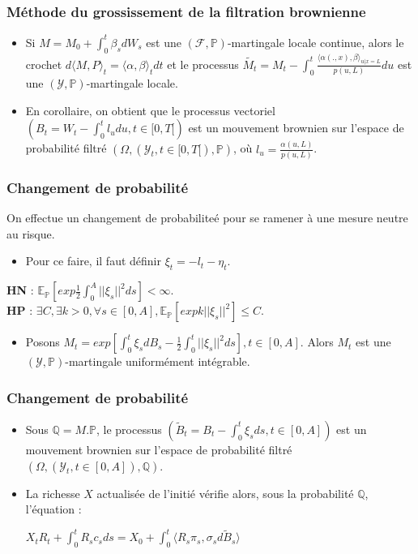 \documentclass[french]{beamer}
\begin{document}
\begin{frame}
\frametitle{Méthode du grossissement de la filtration brownienne}
\begin{itemize}
\item Si $M = M_0 + \int_{0}^{t} \beta_s dW_s$ est une $(\mathcal{F}, \mathbb{P})$-martingale locale continue, alors le crochet $d\langle M,P \rangle_t = \langle \alpha, \beta \rangle_tdt$ et le processus $\tilde{M_t} = M_t - \int_{0}^{t}\frac{\langle \alpha(.,x),\beta\rangle_{u|x=L}}{p(u,L)}du$ est une $(\mathcal{Y}, \mathbb{P})$-martingale locale.
\item En corollaire, on obtient que le processus vectoriel $(B_t = W_t - \int_{0}^{t} l_udu, t \in [0,T[)$ est un mouvement brownien sur l'espace de probabilité filtré $(\Omega, (\mathcal{Y}_t , t \in [0, T[), \mathbb{P})$, où $l_u = \frac{\alpha(u,L)}{p(u,L)}$. 
\end{itemize}
\end{frame}

\begin{frame}
\frametitle{Changement de probabilité}
On effectue un changement de probabiliteé pour se ramener à une mesure neutre au risque.
\begin{itemize}
\item Pour ce faire, il faut définir $\xi_t = - l_t - \eta_t $.\\
\end{itemize}
\textbf{HN} : $\mathbb{E}_\mathbb{P} [exp\frac{1}{2} \int_{0}^{A} ||\xi_s||^2 ds] < \infty$.\\
\textbf{HP} : $\exists C, \exists k >0, \forall s \in [0,A], \mathbb{E}_\mathbb{P}[exp k||\xi_s||^2] \leq C$.\\
\begin{itemize}
\item Posons $M_t = exp[\int_{0}^{t} \xi_s dB_s - \frac{1}{2} \int_{0}^{t} ||\xi_s||^2 ds], t \in [0,A]$. Alors $M_t$ est une $(\mathcal{Y}, \mathbb{P})$-martingale uniformément intégrable.
\end{itemize}
\end{frame}

\begin{frame}
\frametitle{Changement de probabilité}
\begin{itemize}
\item Sous $\mathbb{Q} = M. \mathbb{P}$, le processus $(\tilde{B}_t = B_t - \int_{0}^{t} \xi_s ds, t \in [0, A])$ est un mouvement brownien sur l'espace de probabilité filtré $(\Omega, (\mathcal{Y}_t , t \in [0, A]), \mathbb{Q})$.
\item La richesse $X$ actualisée de l'initié vérifie alors, sous la probabilité $\mathbb{Q}$, l'équation : 
\begin{center}
$X_t R_t + \int_{0}^{t} R_s c_s ds = X_0 + \int_{0}^{t} \langle R_s \pi_s, \sigma_s d\tilde{B}_s \rangle$
\end{center}
\end{itemize}
\end{frame}
\end{document}
